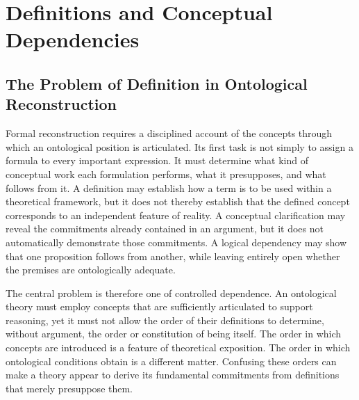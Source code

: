 
\section{Definitions and Conceptual Dependencies}
\label{sec:definitions-and-conceptual-dependencies}

\subsection{The Problem of Definition in Ontological Reconstruction}

Formal reconstruction requires a disciplined account of the concepts
through which an ontological position is articulated. Its first task is
not simply to assign a formula to every important expression. It must
determine what kind of conceptual work each formulation performs, what
it presupposes, and what follows from it. A definition may establish
how a term is to be used within a theoretical framework, but it does
not thereby establish that the defined concept corresponds to an
independent feature of reality. A conceptual clarification may reveal
the commitments already contained in an argument, but it does not
automatically demonstrate those commitments. A logical dependency may
show that one proposition follows from another, while leaving entirely
open whether the premises are ontologically adequate.

The central problem is therefore one of controlled dependence. An
ontological theory must employ concepts that are sufficiently
articulated to support reasoning, yet it must not allow the order of
their definitions to determine, without argument, the order or
constitution of being itself. The order in which concepts are
introduced is a feature of theoretical exposition. The order in which
ontological conditions obtain is a different matter. Confusing these
orders can make a theory appear to derive its fundamental commitments
from definitions that merely presuppose them.

